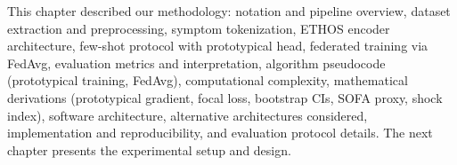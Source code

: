 This chapter described our methodology: notation and pipeline overview, dataset extraction and preprocessing, symptom tokenization, ETHOS encoder architecture, few-shot protocol with prototypical head, federated training via FedAvg, evaluation metrics and interpretation, algorithm pseudocode (prototypical training, FedAvg), computational complexity, mathematical derivations (prototypical gradient, focal loss, bootstrap CIs, SOFA proxy, shock index), software architecture, alternative architectures considered, implementation and reproducibility, and evaluation protocol details. The next chapter presents the experimental setup and design.
